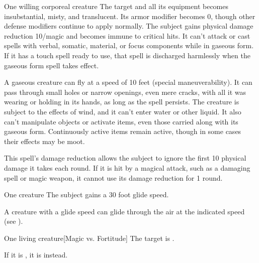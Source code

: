 \spellrng{\rngtouch}
\spelldur{\durshort \dismissable}
\begin{spelltarget}{One willing corporeal creature}
    \spelleffect The target and all its equipment becomes insubstantial, misty, and translucent. Its armor modifier becomes 0, though other defense modifiers continue to apply normally. The subject gains physical damage reduction 10/magic and becomes immune to critical hits. It can't attack or cast spells with verbal, somatic, material, or focus components while in gaseous form. If it has a touch spell ready to use, that spell is discharged harmlessly when the gaseous form spell takes effect.
    \par A gaseous creature can fly at a speed of 10 feet (special maneuverability). It can pass through small holes or narrow openings, even mere cracks, with all it was wearing or holding in its hands, as long as the spell persists. The creature is subject to the effects of wind, and it can't enter water or other liquid. It also can't manipulate objects or activate items, even those carried along with its gaseous form. Continuously active items remain active, though in some cases their effects may be moot.
\end{spelltarget}
\spellnotes This spell's damage reduction allows the subject to ignore the first 10 physical damage it takes each round. If it is hit by a magical attack, such as a damaging spell or magic weapon, it cannot use its damage reduction for 1 round.

\spellrng{\rngmed}
\spelldur{\durlong}
\begin{spelltarget}{One creature}
    \spelleffect The subject gains a 30 foot glide speed.
\end{spelltarget}
\spellnotes A creature with a glide speed can glide through the air at the indicated speed (see ).

\spellrng{\rngmed}
\begin{spelltarget}{One living creature}[Magic vs. Fortitude]
    \spellsuccess The target is \sickened.

    If it is \bloodied, it is \nauseated instead.
\end{spelltarget}

